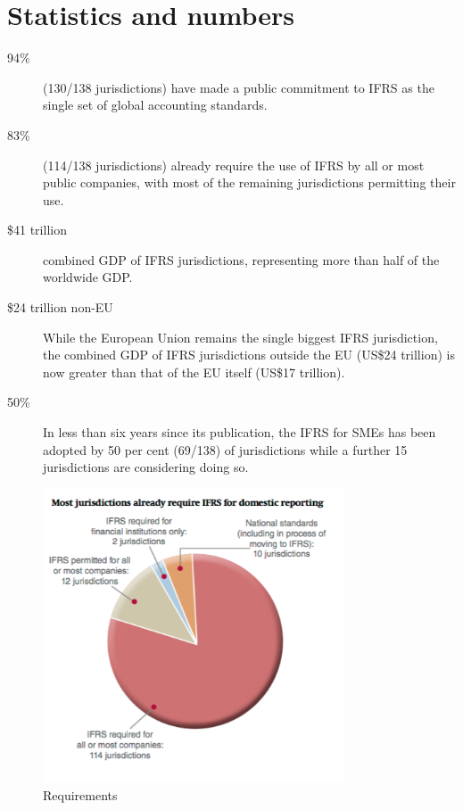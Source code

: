 \section{Statistics and numbers}

\begin{description}
	\item[94\%] (130/138 jurisdictions) have made a public commitment to IFRS
	as the single set of global accounting standards.
	\item[83\%](114/138 jurisdictions) already require the use of IFRS by all or most public companies, with most of the remaining jurisdictions permitting their use.
	\item[\$41 trillion] combined GDP of IFRS jurisdictions, representing more than half of the worldwide GDP.
	\item[\$24 trillion non-EU] While the European Union remains the single biggest IFRS jurisdiction, the combined GDP of IFRS jurisdictions outside the EU (US\$24 trillion) is now greater than that of the EU itself (US\$17 trillion).
	\item[50\%]In less than six years since its publication, the IFRS for SMEs has been adopted by 50 per cent (69/138) of jurisdictions while a further 15 jurisdictions are considering doing so.
\end{description}

\begin{figure}[h]
\caption{Requirements}
\centering
\includegraphics[width=0.8\textwidth]{images/requirements.png}
\end{figure}


